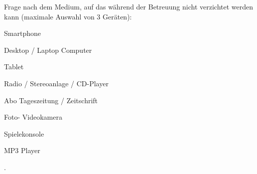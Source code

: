 Frage nach dem Medium, auf das während der Betreuung nicht verzichtet werden kann (maximale Auswahl von 3 Geräten): 
\begin{seriate}
  \item Smartphone
  \item Desktop / Laptop Computer
  \item Tablet
  \item Radio / Stereoanlage / CD-Player
  \item Abo Tageszeitung / Zeitschrift
  \item Foto- Videokamera
  \item Spielekonsole
  \item MP3 Player
\end{seriate}.
